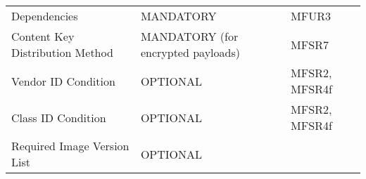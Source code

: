 \documentclass[0-thesis.tex]{subfiles}
\begin{document}
\begin{longtable}[]{@{}lll@{}}
    \begin{minipage}[t]{0.32\columnwidth}\raggedright\strut
    Dependencies\strut
    \end{minipage} & \begin{minipage}[t]{0.36\columnwidth}\raggedright\strut
    MANDATORY\strut
    \end{minipage} & \begin{minipage}[t]{0.23\columnwidth}\raggedright\strut
    MFUR3\strut
    \end{minipage}\tabularnewline
    \begin{minipage}[t]{0.32\columnwidth}\raggedright\strut
    Content Key Distribution Method\strut
    \end{minipage} & \begin{minipage}[t]{0.36\columnwidth}\raggedright\strut
    MANDATORY (for encrypted payloads)\strut
    \end{minipage} & \begin{minipage}[t]{0.23\columnwidth}\raggedright\strut
    MFSR7\strut
    \end{minipage}\tabularnewline
    \begin{minipage}[t]{0.32\columnwidth}\raggedright\strut
    Vendor ID Condition\strut
    \end{minipage} & \begin{minipage}[t]{0.36\columnwidth}\raggedright\strut
    OPTIONAL\strut
    \end{minipage} & \begin{minipage}[t]{0.23\columnwidth}\raggedright\strut
    MFSR2, MFSR4f\strut
    \end{minipage}\tabularnewline
    \begin{minipage}[t]{0.32\columnwidth}\raggedright\strut
    Class ID Condition\strut
    \end{minipage} & \begin{minipage}[t]{0.36\columnwidth}\raggedright\strut
    OPTIONAL\strut
    \end{minipage} & \begin{minipage}[t]{0.23\columnwidth}\raggedright\strut
    MFSR2, MFSR4f\strut
    \end{minipage}\tabularnewline
    \begin{minipage}[t]{0.32\columnwidth}\raggedright\strut
    Required Image Version List\strut
    \end{minipage} & \begin{minipage}[t]{0.36\columnwidth}\raggedright\strut
    OPTIONAL\strut
    \end{minipage} & \begin{minipage}[t]{0.23\columnwidth}\raggedright\strut

\end{minipage}
\end{longtable}
\end{document}
